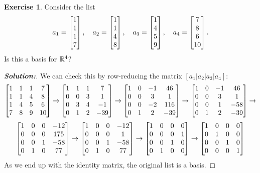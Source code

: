 \documentclass[a4paper]{amsart}
\theoremstyle{definition}
\newtheorem{exercise}{Exercise}
\newenvironment{solution}{\begin{proof}[\textbf{Solution:}] \vphantom{u}}{\end{proof}}
\begin{document}
\begin{exercise}\label{ex-basis-ii}
 Consider the list 
 \[ 
  a_1 = \left[\begin{matrix} 1\\1\\1\\7 \end{matrix}\right], \quad
  a_2 = \left[\begin{matrix} 1\\1\\4\\8 \end{matrix}\right], \quad
  a_3 = \left[\begin{matrix} 1\\4\\5\\9 \end{matrix}\right], \quad
  a_4 = \left[\begin{matrix} 7\\8\\6\\10\end{matrix}\right].
 \]
 Is this a basis for ${\mathbb{R}}^4$?
\end{exercise}
\begin{solution}
 We can check this by row-reducing the matrix $[a_1|a_2|a_3|a_4]$:
 \[ 
  \left[\begin{matrix} 1 & 1 & 1 & 7 \\ 
       1 & 1 & 4 & 8 \\
       1 & 4 & 5 & 6 \\
       7 & 8 & 9 & 10 \end{matrix}\right] 
  \to 
  \left[\begin{matrix} 1 & 1 & 1 &   7 \\ 
       0 & 0 & 3 &   1 \\
       0 & 3 & 4 &  -1 \\
       0 & 1 & 2 & -39 \end{matrix}\right] 
  \to 
  \left[\begin{matrix} 1 & 0 &-1 &  46 \\ 
       0 & 0 & 3 &   1 \\
       0 & 0 &-2 & 116 \\
       0 & 1 & 2 & -39 \end{matrix}\right] 
  \to 
  \left[\begin{matrix} 1 & 0 &-1 &  46 \\ 
       0 & 0 & 3 &   1 \\
       0 & 0 & 1 & -58 \\
       0 & 1 & 2 & -39 \end{matrix}\right] 
  \to 
 \] \[
  \left[\begin{matrix} 1 & 0 & 0 & -12 \\ 
       0 & 0 & 0 & 175 \\
       0 & 0 & 1 & -58 \\
       0 & 1 & 0 &  77 \end{matrix}\right] 
  \to 
  \left[\begin{matrix} 1 & 0 & 0 & -12 \\ 
       0 & 0 & 0 &   1 \\
       0 & 0 & 1 & -58 \\
       0 & 1 & 0 &  77 \end{matrix}\right] 
  \to 
  \left[\begin{matrix} 1 & 0 & 0 &   0 \\ 
       0 & 0 & 0 &   1 \\
       0 & 0 & 1 &   0 \\
       0 & 1 & 0 &   0 \end{matrix}\right] 
  \to 
  \left[\begin{matrix} 1 & 0 & 0 &   0 \\ 
       0 & 1 & 0 &   0 \\
       0 & 0 & 1 &   0 \\
       0 & 0 & 0 &   1 \end{matrix}\right]
 \]
 As we end up with the identity matrix, the original list is a basis.
\end{solution}
\end{document}
